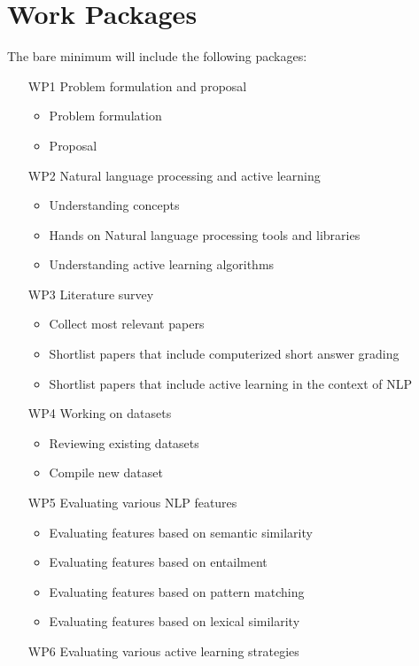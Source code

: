 \documentclass[rnd]{mas_proposal}
\begin{document}
\section{Work Packages}
The bare minimum will include the following packages:
\begin{enumerate}
    \item[WP1] Problem formulation and proposal
    \begin{itemize}
    \item Problem formulation
    \item Proposal
    \end{itemize}
    \item[WP2] Natural language processing and active learning
    \begin{itemize}
    \item Understanding concepts
    \item Hands on Natural language processing tools and libraries
    \item Understanding active learning algorithms
    \end{itemize}
    \item[WP3] Literature survey
    \begin{itemize}
    \item Collect most relevant papers
    \item Shortlist papers that include computerized short answer grading
    \item Shortlist papers that include active learning in the context of NLP
    \end{itemize}
    \item[WP4] Working on datasets
    \begin{itemize}
    \item Reviewing existing datasets
    \item Compile new dataset
    \end{itemize}
	\item[WP5] Evaluating various NLP features
	\begin{itemize}
    \item Evaluating features based on semantic similarity
    \item Evaluating features based on entailment
    \item Evaluating features based on pattern matching
    \item Evaluating features based on lexical similarity
    \end{itemize}
	\item[WP6] Evaluating various active learning strategies

\end{enumerate}
\end{document}
